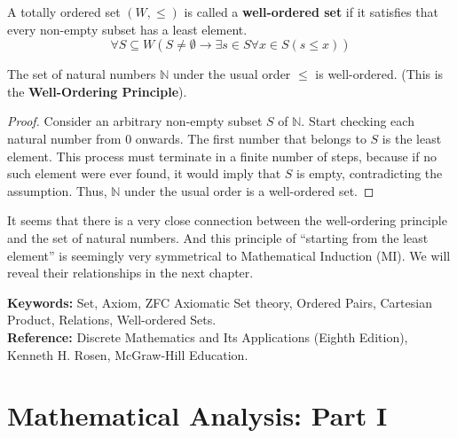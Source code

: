\documentclass[oneside]{book}
\begin{document}
\begin{definition}
A totally ordered set $(W, \le)$ is called a \textbf{well-ordered set} if it satisfies that every non-empty subset has a least element.
$$ \forall S \subseteq W (S \ne \emptyset \to \exists s \in S \forall x \in S (s \le x)) $$
\end{definition}

\begin{theorem}
The set of natural numbers $\mathbb{N}$ under the usual order $\le$ is well-ordered. (This is the \textbf{Well-Ordering Principle}).
\end{theorem}
\begin{proof}
Consider an arbitrary non-empty subset $S$ of $\mathbb{N}$. Start checking each natural number from 0 onwards. The first number that belongs to $S$ is the least element. This process must terminate in a finite number of steps, because if no such element were ever found, it would imply that $S$ is empty, contradicting the assumption. Thus, $\mathbb{N}$ under the usual order is a well-ordered set.
\end{proof}

It seems that there is a very close connection between the well-ordering principle and the set of natural numbers. And this principle of “starting from the least element” is seemingly very symmetrical to Mathematical Induction (MI). We will reveal their relationships in the next chapter.

\noindent
\textbf{Keywords:} Set, Axiom, ZFC Axiomatic Set theory, Ordered Pairs, Cartesian Product, Relations, Well-ordered Sets. \\
\textbf{Reference:} Discrete Mathematics and Its Applications (Eighth Edition), Kenneth H. Rosen, McGraw-Hill Education.

\cleardoublepage

\chapter{Mathematical Analysis: Part I}
\end{document}
